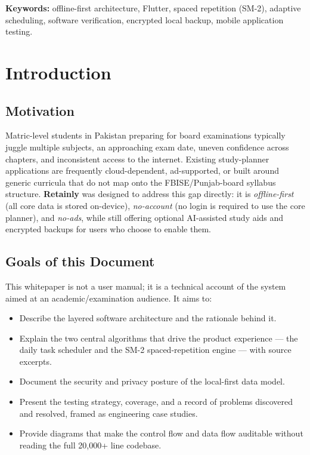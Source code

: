 \documentclass[11pt,a4paper]{article}
\begin{document}
\vspace{0.3cm}
\noindent\textbf{Keywords:} offline-first architecture, Flutter, spaced repetition (SM-2), adaptive scheduling, software verification, encrypted local backup, mobile application testing.

\newpage
\tableofcontents
\newpage

\section{Introduction}

\subsection{Motivation}
Matric-level students in Pakistan preparing for board examinations typically juggle multiple subjects, an approaching exam date, uneven confidence across chapters, and inconsistent access to the internet. Existing study-planner applications are frequently cloud-dependent, ad-supported, or built around generic curricula that do not map onto the FBISE/Punjab-board syllabus structure. \textbf{Retainly} was designed to address this gap directly: it is \emph{offline-first} (all core data is stored on-device), \emph{no-account} (no login is required to use the core planner), and \emph{no-ads}, while still offering optional AI-assisted study aids and encrypted backups for users who choose to enable them.

\subsection{Goals of this Document}
This whitepaper is not a user manual; it is a technical account of the system aimed at an academic/examination audience. It aims to:
\begin{itemize}[nosep]
    \item Describe the layered software architecture and the rationale behind it.
    \item Explain the two central algorithms that drive the product experience --- the daily task scheduler and the SM-2 spaced-repetition engine --- with source excerpts.
    \item Document the security and privacy posture of the local-first data model.
    \item Present the testing strategy, coverage, and a record of problems discovered and resolved, framed as engineering case studies.
    \item Provide diagrams that make the control flow and data flow auditable without reading the full 20{,}000+ line codebase.
\end{itemize}
\end{document}
